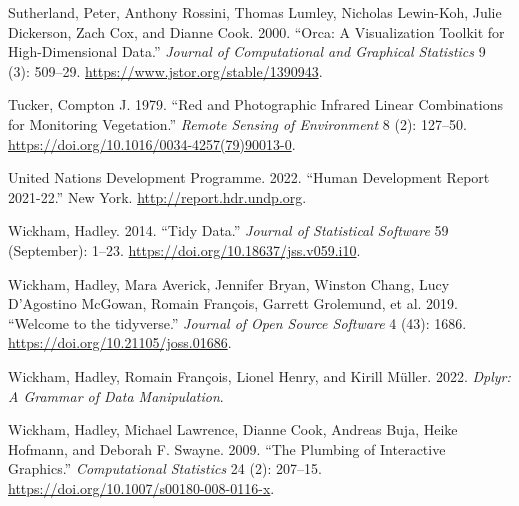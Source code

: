 \documentclass[
]{article}
\newlength{\cslhangindent}
\newlength{\cslentryspacingunit} %
\newenvironment{CSLReferences}[2] %
 {%
  \setlength{\parindent}{0pt}
  \ifodd #1
  \let\oldpar\par
  \def\par{\hangindent=\cslhangindent\oldpar}
  \fi
  \setlength{\parskip}{#2\cslentryspacingunit}
 }%
 {}
\begin{document}
\begin{CSLReferences}{1}{0}
\leavevmode{}%
Sutherland, Peter, Anthony Rossini, Thomas Lumley, Nicholas Lewin-Koh,
Julie Dickerson, Zach Cox, and Dianne Cook. 2000. {``Orca: {A}
{Visualization} {Toolkit} for {High}-{Dimensional} {Data}.''}
\emph{Journal of Computational and Graphical Statistics} 9 (3): 509--29.
\url{https://www.jstor.org/stable/1390943}.

\leavevmode{}%
Tucker, Compton J. 1979. {``Red and Photographic Infrared Linear
Combinations for Monitoring Vegetation.''} \emph{Remote Sensing of
Environment} 8 (2): 127--50.
\url{https://doi.org/10.1016/0034-4257(79)90013-0}.

\leavevmode{}%
United Nations Development Programme. 2022. {``Human Development Report
2021-22.''} New York. \url{http://report.hdr.undp.org}.

\leavevmode{}%
Wickham, Hadley. 2014. {``Tidy {Data}.''} \emph{Journal of Statistical
Software} 59 (September): 1--23.
\url{https://doi.org/10.18637/jss.v059.i10}.

\leavevmode{}%
Wickham, Hadley, Mara Averick, Jennifer Bryan, Winston Chang, Lucy
D'Agostino McGowan, Romain François, Garrett Grolemund, et al. 2019.
{``Welcome to the {tidyverse}.''} \emph{Journal of Open Source Software}
4 (43): 1686. \url{https://doi.org/10.21105/joss.01686}.

\leavevmode{}%
Wickham, Hadley, Romain François, Lionel Henry, and Kirill Müller. 2022.
\emph{Dplyr: A Grammar of Data Manipulation}.

\leavevmode{}%
Wickham, Hadley, Michael Lawrence, Dianne Cook, Andreas Buja, Heike
Hofmann, and Deborah F. Swayne. 2009. {``The Plumbing of Interactive
Graphics.''} \emph{Computational Statistics} 24 (2): 207--15.
\url{https://doi.org/10.1007/s00180-008-0116-x}.

\end{CSLReferences}
\end{document}

